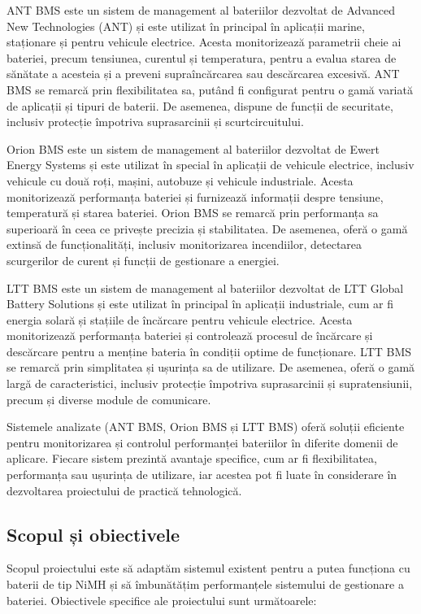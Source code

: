 ANT BMS este un sistem de management al bateriilor dezvoltat de Advanced New Technologies (ANT) și este utilizat în principal în aplicații marine, staționare și pentru vehicule electrice. Acesta monitorizează parametrii cheie ai bateriei, precum tensiunea, curentul și temperatura, pentru a evalua starea de sănătate a acesteia și a preveni supraîncărcarea sau descărcarea excesivă. ANT BMS se remarcă prin flexibilitatea sa, putând fi configurat pentru o gamă variată de aplicații și tipuri de baterii. De asemenea, dispune de funcții de securitate, inclusiv protecție împotriva suprasarcinii și scurtcircuitului.

Orion BMS este un sistem de management al bateriilor dezvoltat de Ewert Energy Systems și este utilizat în special în aplicații de vehicule electrice, inclusiv vehicule cu două roți, mașini, autobuze și vehicule industriale. Acesta monitorizează performanța bateriei și furnizează informații despre tensiune, temperatură și starea bateriei. Orion BMS se remarcă prin performanța sa superioară în ceea ce privește precizia și stabilitatea. De asemenea, oferă o gamă extinsă de funcționalități, inclusiv monitorizarea incendiilor, detectarea scurgerilor de curent și funcții de gestionare a energiei.

LTT BMS este un sistem de management al bateriilor dezvoltat de LTT Global Battery Solutions și este utilizat în principal în aplicații industriale, cum ar fi energia solară și stațiile de încărcare pentru vehicule electrice. Acesta monitorizează performanța bateriei și controlează procesul de încărcare și descărcare pentru a menține bateria în condiții optime de funcționare. LTT BMS se remarcă prin simplitatea și ușurința sa de utilizare. De asemenea, oferă o gamă largă de caracteristici, inclusiv protecție împotriva suprasarcinii și supratensiunii, precum și diverse module de comunicare.

Sistemele analizate (ANT BMS, Orion BMS și LTT BMS) oferă soluții eficiente pentru monitorizarea și controlul performanței bateriilor în diferite domenii de aplicare. Fiecare sistem prezintă avantaje specifice, cum ar fi flexibilitatea, performanța sau ușurința de utilizare, iar acestea pot fi luate în considerare în dezvoltarea proiectului de practică tehnologică.

\subsection{Scopul și obiectivele}

Scopul proiectului este să adaptăm sistemul existent pentru a putea funcționa cu baterii de tip NiMH și să îmbunătățim performanțele sistemului de gestionare a bateriei. Obiectivele specifice ale proiectului sunt următoarele:


